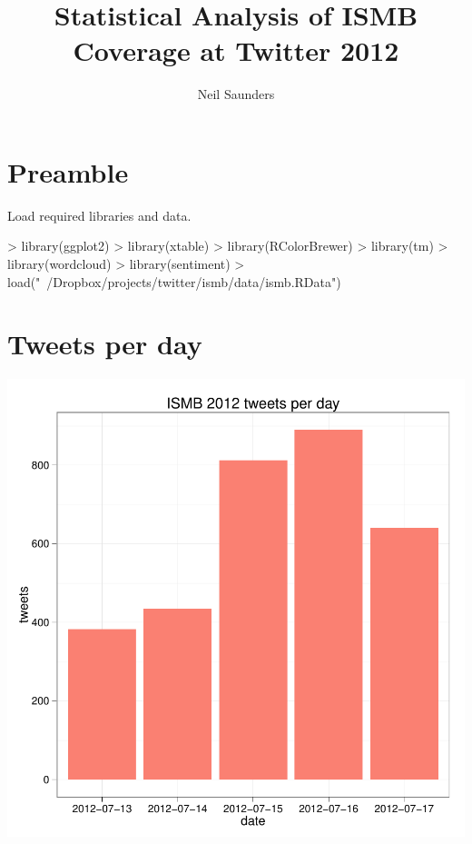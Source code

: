 \documentclass[a4paper,10pt]{article}
\title{Statistical Analysis of ISMB Coverage at Twitter 2012}
\author{Neil Saunders}
\begin{document}
\lstset{breaklines=true}

\maketitle

\section{Preamble}
Load required libraries and data.
\begin{Schunk}
\begin{Sinput}
> library(ggplot2)
> library(xtable)
> library(RColorBrewer)
> library(tm)
> library(wordcloud)
> library(sentiment)
> load("~/Dropbox/projects/twitter/ismb/data/ismb.RData")
\end{Sinput}
\end{Schunk}

\section{Tweets per day}
\begin{center}
\begin{Schunk}
\end{Schunk}
\includegraphics{ismb-002}
\end{center}
\end{document}
